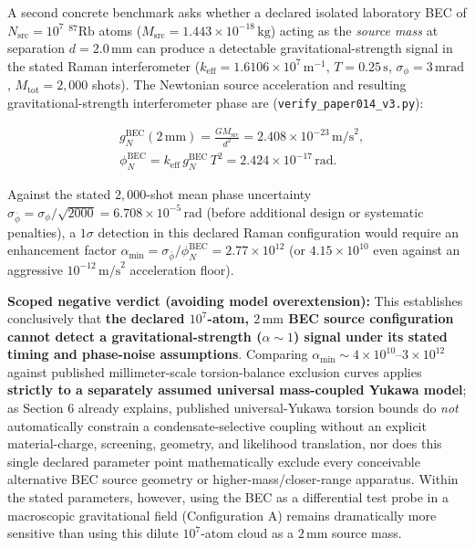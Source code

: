 \documentclass[
  american,
  11pt,
  letterpaper,
]{article}
\begin{document}
A second concrete benchmark asks whether a declared isolated laboratory BEC of \(N_{\mathrm{src}} = 10^7\) \(^{87}\mathrm{Rb}\) atoms (\(M_{\mathrm{src}} = 1.443 \times 10^{-18}\,\mathrm{kg}\)) acting as the \emph{source mass} at separation \(d = 2.0\,\mathrm{mm}\) can produce a detectable gravitational-strength signal in the stated Raman interferometer (\(k_{\mathrm{eff}} = 1.6106 \times 10^7\,\mathrm{m}^{-1}\), \(T = 0.25\,\mathrm{s}\), \(\sigma_\phi = 3\,\mathrm{mrad}\), \(M_{\mathrm{tot}} = 2{,}000\) shots). The Newtonian source acceleration and resulting gravitational-strength interferometer phase are (\nolinkurl{verify_paper014_v3.py}):

\begin{equation}
\begin{aligned}
& g_N^{\mathrm{BEC}}(2\,\mathrm{mm}) = \frac{G M_{\mathrm{src}}}{d^2} = 2.408 \times 10^{-23}\,\mathrm{m/s}^2, \\
& \phi_N^{\mathrm{BEC}} = k_{\mathrm{eff}}\,g_N^{\mathrm{BEC}}\,T^2 = 2.424 \times 10^{-17}\,\mathrm{rad}.
\end{aligned}
\end{equation}

Against the stated \(2{,}000\)-shot mean phase uncertainty \(\sigma_{\bar{\phi}} = \sigma_\phi/\sqrt{2000} = 6.708 \times 10^{-5}\,\mathrm{rad}\) (before additional design or systematic penalties), a \(1\sigma\) detection in this declared Raman configuration would require an enhancement factor \(\alpha_{\min} = \sigma_{\bar{\phi}}/\phi_N^{\mathrm{BEC}} = 2.77 \times 10^{12}\) (or \(4.15 \times 10^{10}\) even against an aggressive \(10^{-12}\,\mathrm{m/s}^2\) acceleration floor).

\textbf{Scoped negative verdict (avoiding model overextension):} This establishes conclusively that \textbf{the declared \(10^7\)-atom, \(2\,\mathrm{mm}\) BEC source configuration cannot detect a gravitational-strength (\(\alpha \sim 1\)) signal under its stated timing and phase-noise assumptions}. Comparing \(\alpha_{\min} \sim 4 \times 10^{10}\text{--}3 \times 10^{12}\) against published millimeter-scale torsion-balance exclusion curves applies \textbf{strictly to a separately assumed universal mass-coupled Yukawa model}; as Section 6 already explains, published universal-Yukawa torsion bounds do \emph{not} automatically constrain a condensate-selective coupling without an explicit material-charge, screening, geometry, and likelihood translation, nor does this single declared parameter point mathematically exclude every conceivable alternative BEC source geometry or higher-mass/closer-range apparatus. Within the stated parameters, however, using the BEC as a differential test probe in a macroscopic gravitational field (Configuration A) remains dramatically more sensitive than using this dilute \(10^7\)-atom cloud as a \(2\,\mathrm{mm}\) source mass.
\end{document}
